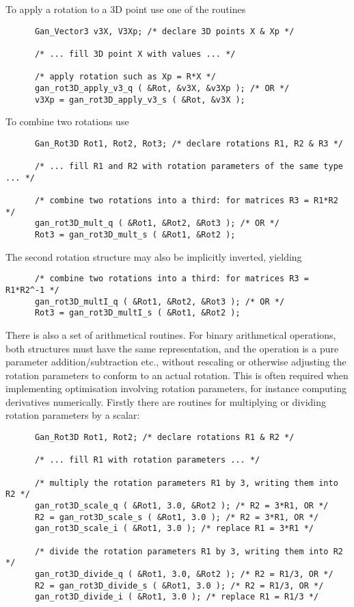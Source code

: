 To apply a rotation to a 3D point use one of the routines
\begin{verbatim}
      Gan_Vector3 v3X, V3Xp; /* declare 3D points X & Xp */

      /* ... fill 3D point X with values ... */

      /* apply rotation such as Xp = R*X */
      gan_rot3D_apply_v3_q ( &Rot, &v3X, &v3Xp ); /* OR */
      v3Xp = gan_rot3D_apply_v3_s ( &Rot, &v3X );
\end{verbatim}

To combine two rotations use
\begin{verbatim}
      Gan_Rot3D Rot1, Rot2, Rot3; /* declare rotations R1, R2 & R3 */

      /* ... fill R1 and R2 with rotation parameters of the same type ... */

      /* combine two rotations into a third: for matrices R3 = R1*R2 */
      gan_rot3D_mult_q ( &Rot1, &Rot2, &Rot3 ); /* OR */
      Rot3 = gan_rot3D_mult_s ( &Rot1, &Rot2 );
\end{verbatim}
The second rotation structure may also be implicitly inverted, yielding
\begin{verbatim}
      /* combine two rotations into a third: for matrices R3 = R1*R2^-1 */
      gan_rot3D_multI_q ( &Rot1, &Rot2, &Rot3 ); /* OR */
      Rot3 = gan_rot3D_multI_s ( &Rot1, &Rot2 );
\end{verbatim}

There is also a set of arithmetical routines. For binary arithmetical
operations, both structures  must have the same representation, and the
operation is a pure parameter addition/subtraction etc.,
without rescaling or otherwise
adjusting the rotation parameters to conform to an actual rotation.
This is often required when implementing optimisation involving rotation
parameters, for instance computing derivatives numerically.
Firstly there are routines for multiplying or dividing rotation
parameters by a scalar:
\begin{verbatim}
      Gan_Rot3D Rot1, Rot2; /* declare rotations R1 & R2 */

      /* ... fill R1 with rotation parameters ... */

      /* multiply the rotation parameters R1 by 3, writing them into R2 */
      gan_rot3D_scale_q ( &Rot1, 3.0, &Rot2 ); /* R2 = 3*R1, OR */
      R2 = gan_rot3D_scale_s ( &Rot1, 3.0 ); /* R2 = 3*R1, OR */
      gan_rot3D_scale_i ( &Rot1, 3.0 ); /* replace R1 = 3*R1 */

      /* divide the rotation parameters R1 by 3, writing them into R2 */
      gan_rot3D_divide_q ( &Rot1, 3.0, &Rot2 ); /* R2 = R1/3, OR */
      R2 = gan_rot3D_divide_s ( &Rot1, 3.0 ); /* R2 = R1/3, OR */
      gan_rot3D_divide_i ( &Rot1, 3.0 ); /* replace R1 = R1/3 */
\end{verbatim}

